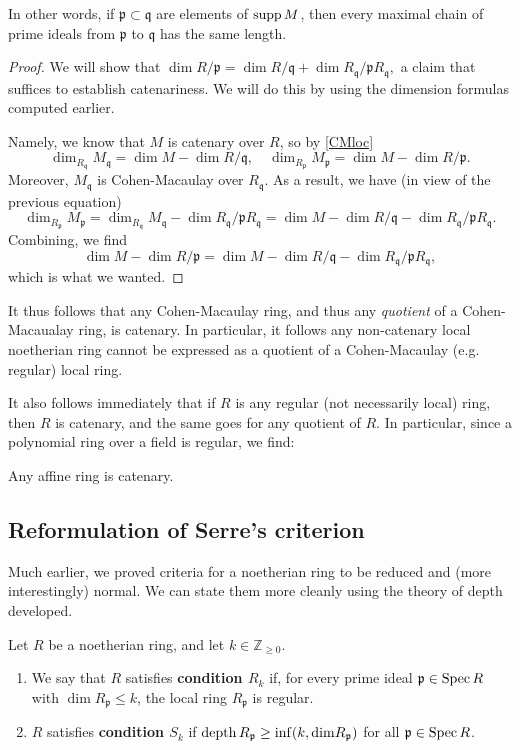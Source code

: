 In other words, if $\mathfrak{p} \subset \mathfrak{q}$ are elements of
$\operatorname{supp} M$, then every maximal chain of prime ideals from $\mathfrak{p}$ to
$\mathfrak{q}$ has the same length. 
\begin{proof} 
We will show that
\( \dim R/\mathfrak{p} = \dim R/\mathfrak{q} + \dim
R_{\mathfrak{q}}/\mathfrak{p} R_{\mathfrak{q}}, \) a claim that
suffices to establish catenariness.
We will do this by using the dimension formulas computed earlier.

Namely, we know that
$M$ is catenary over $R$, so  by \cref{CMloc}
\[ \dim_{R_{\mathfrak{q}}} M_{\mathfrak{q}} = \dim M - \dim
R/\mathfrak{q}, \quad
\dim_{ R_{\mathfrak{p}}} M_{\mathfrak{p}} = \dim M - \dim R/\mathfrak{p}.
\]
Moreover, $M_{\mathfrak{q}} $ is Cohen-Macaulay over
$R_{\mathfrak{q}}$. As a result, we have (in view of the previous equation)
\[ \dim_{R_{\mathfrak{p}}}
M_{\mathfrak{p}} = \dim_{R_{\mathfrak{q}}} M_{\mathfrak{q}} - \dim
R_{\mathfrak{q}}/\mathfrak{p}R_{\mathfrak{q}} = 
\dim M - \dim R/\mathfrak{q} - \dim
R_{\mathfrak{q}}/\mathfrak{p}R_{\mathfrak{q}} 
.  \]
Combining, we find
\[ \dim M - \dim R/\mathfrak{p} =  \dim M - \dim R/\mathfrak{q} - \dim
R_{\mathfrak{q}}/\mathfrak{p}R_{\mathfrak{q}} ,
 \]
which is what we wanted.
\end{proof} 

It thus follows that any Cohen-Macaulay ring, and thus any \emph{quotient} of a
Cohen-Macaualay ring, is catenary. In particular, it follows any non-catenary
local noetherian ring cannot be expressed as a quotient of a
Cohen-Macaulay (e.g. regular) local ring. 

It also follows immediately that if $R$ is any regular (not necessarily local)
ring, then $R$ is catenary, and the same goes for any quotient of $R$.
In particular, since a polynomial ring over a field is regular, we find:
\begin{proposition} 
Any affine ring is catenary. 
\end{proposition} 

\subsection{Reformulation of Serre's criterion}

Much earlier, we proved criteria for a noetherian ring to be reduced and (more
interestingly) normal.
We can state them more cleanly using the theory of depth developed.

\begin{definition} 
Let $R$ be a noetherian ring, and let $k \in \mathbb{Z}_{\geq 0}$.
\begin{enumerate}
\item We say that $R$ satisfies \textbf{condition $R_k$} if, for every
prime ideal $\mathfrak{p} \in \operatorname{Spec} R$ with $\dim R_{\mathfrak{p}} \leq k$,
the local ring $R_{\mathfrak{p}}$ is regular.
\item $R$ satisfies \textbf{condition $S_k$} if $\operatorname{depth} R_{\mathfrak{p}} \geq
\inf(k, \mathrm{dim} R_{\mathfrak{p}})$ for all $\mathfrak{p} \in \operatorname{Spec} R$.
\end{enumerate}
\end{definition} 

